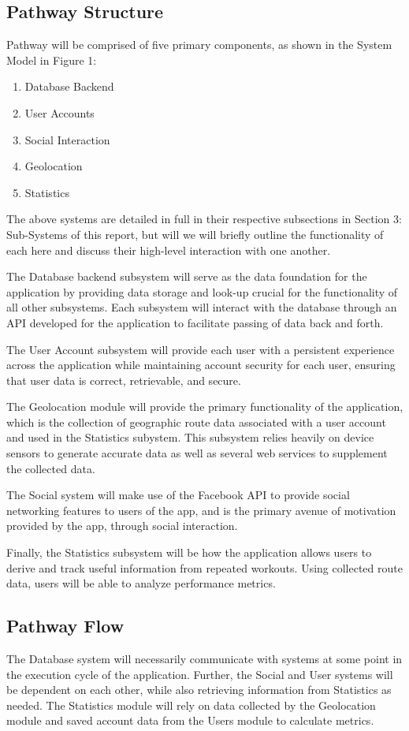 ﻿\documentclass{article}
\begin{document}
\subsection{Pathway Structure}

Pathway will be comprised of five primary components, as shown in the System Model in Figure 1:
\begin{enumerate}
    \item Database Backend
    \item User Accounts
    \item Social Interaction
    \item Geolocation
    \item Statistics
\end{enumerate}
The above systems are detailed in full in their respective subsections in Section 3: Sub-Systems of this report, but will we will briefly outline the functionality of each here and discuss their high-level interaction with one another.

The Database backend subsystem will serve as the data foundation for the application by providing data storage and look-up crucial for the functionality of all other subsystems. Each subsystem will interact with the database through an API developed for the application to facilitate passing of data back and forth.

The User Account subsystem will provide each user with a persistent experience across the application while maintaining account security for each user, ensuring that user data is correct, retrievable, and secure.

The Geolocation module will provide the primary functionality of the application, which is the collection of geographic route data associated with a user account and used in the Statistics subystem. This subsystem relies heavily on device sensors to generate accurate data as well as several web services to supplement the collected data.

The Social system will make use of the Facebook API to provide social networking features to users of the app, and is the primary avenue of motivation provided by the app, through social interaction.

Finally, the Statistics subsystem will be how the application allows users to derive and track useful information from repeated workouts. Using collected route data, users will be able to analyze performance metrics.

\subsection{Pathway Flow}
The Database system will necessarily communicate with systems at some point in the execution cycle of the application. Further, the Social and User systems will be dependent on each other, while also retrieving information from Statistics as needed.
The Statistics module will rely on data collected by the Geolocation module and saved account data from the Users module to calculate metrics.
\end{document}
